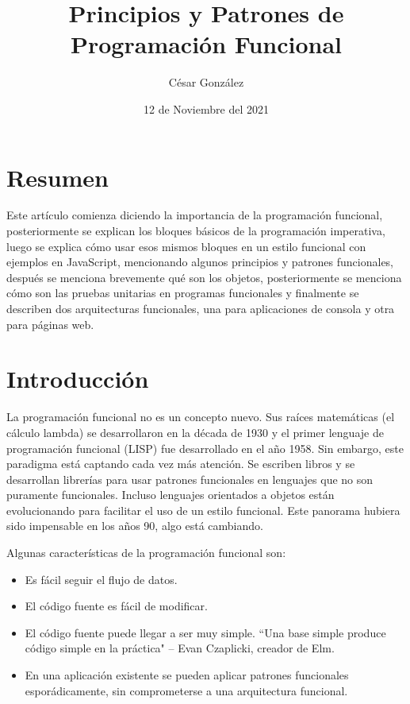 \documentclass{article}
\begin{document}
\title{\Large{\textbf{Principios y Patrones de Programación Funcional}}}
\author{César González}
\date{12 de Noviembre del 2021}
\maketitle


\pagebreak
\section*{Resumen}
Este artículo comienza diciendo la importancia de la programación funcional, posteriormente se explican los bloques básicos de la programación imperativa, luego se explica cómo usar esos mismos bloques en un estilo funcional con ejemplos en JavaScript, mencionando algunos principios y patrones funcionales, después se menciona brevemente qué son los objetos, posteriormente se menciona cómo son las pruebas unitarias en programas funcionales y finalmente se describen dos arquitecturas funcionales, una para aplicaciones de consola y otra para páginas web.

\section*{Introducción}
La programación funcional no es un concepto nuevo. Sus raíces matemáticas (el cálculo lambda) se desarrollaron en la década de 1930 y el primer lenguaje de programación funcional (LISP) fue desarrollado en el año 1958. Sin embargo, este paradigma está captando cada vez más atención. Se escriben libros y se desarrollan librerías para usar patrones funcionales en lenguajes que no son puramente funcionales. Incluso lenguajes orientados a objetos están evolucionando para facilitar el uso de un estilo funcional. Este panorama hubiera sido impensable en los años 90, algo está cambiando.\cite{why-isnt-fp-norm}

Algunas características de la programación funcional son:
\begin{itemize}
  \item Es fácil seguir el flujo de datos.
  \item El código fuente es fácil de modificar.
  \item El código fuente puede llegar a ser muy simple. ``Una base simple produce código simple en la práctica" \medspace – Evan Czaplicki, creador de Elm.\cite{mainstream-elm}
  \item En una aplicación existente se pueden aplicar patrones funcionales esporádicamente, sin comprometerse a una arquitectura funcional.\cite{skeptics-functional-style}
\end{itemize}
\end{document}
